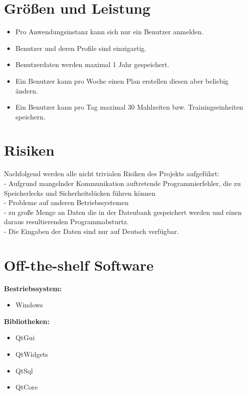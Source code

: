 \documentclass[12pt,a4paper,onecolumn]{article}
\begin{document}
\section{Größen und Leistung}
\begin{itemize}
    \item Pro Anwendungsinstanz kann sich nur ein Benutzer anmelden.
    \item Benutzer und deren Profile sind einzigartig.
    \item Benutzerdaten werden maximal 1 Jahr gespeichert.
    \item Ein Benutzer kann pro Woche einen Plan erstellen diesen aber beliebig ändern.
    \item Ein Benutzer kann pro Tag maximal 30 Mahlzeiten bzw. Trainingseinheiten speichern.
\end{itemize}

\section{Risiken}
Nachfolgend werden alle nicht trivialen Risiken des Projekts aufgeführt: \\
- Aufgrund mangelnder Kommunikation auftretende Programmierfehler, die zu Speicherlecks und Sicherheitslücken führen können\\
- Probleme auf anderen Betriebssystemen \\
- zu große Menge an Daten die in der Datenbank gespeichert werden und einen daraus resultierenden Programmabsturtz. \\
- Die Eingaben der Daten sind nur auf Deutsch verfügbar.

\section{Off-the-shelf Software}

\textbf{Bestriebssystem:} 
\begin{itemize}
    \item Windows
\end{itemize}

\textbf{Bibliotheken:} 
\begin{itemize}
    \item QtGui
    \item QtWidgets
    \item QtSql
    \item QtCore
\end{itemize}
\end{document}
